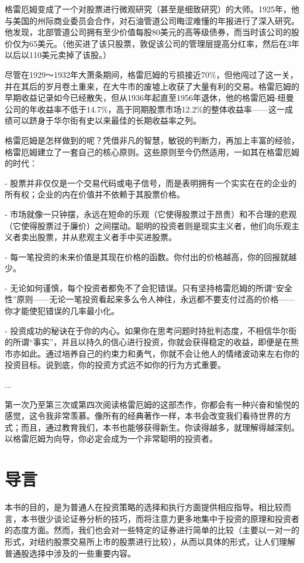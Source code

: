 \documentclass[12pt,oneside]{book}
\begin{document}
格雷厄姆变成了一个对股票进行微观研究（甚至是细致研究）的大师。1925年，他与美国的州际商业委员会合作，对石油管道公司晦涩难懂的年报进行了深入研究。他发现，北部管道公司拥有至少价值每股80美元的高等级债券，而当时该公司的股价仅为65美元。（他买进了该只股票，敦促该公司的管理层提高分红率，然后在3年以后以110美元卖掉了该股。）

尽管在1929～1932年大萧条期间，格雷厄姆的亏损接近70\%，但他闯过了这一关，并在其后的岁月卷土重来，在大牛市的废墟上收获了大量有利的交易。格雷厄姆的早期收益记录如今已经散失，但从1936年起直至1956年退休，他的格雷厄姆-纽曼公司的年收益率不低于14.7\%，高于同期股票市场12.2\%的整体收益率——这一成绩可以跻身于华尔街有史以来最佳的长期收益率之列。

格雷厄姆是怎样做到的呢？凭借非凡的智慧，敏锐的判断力，再加上丰富的经验，格雷厄姆建立了一套自己的核心原则。这些原则至今仍然适用，一如其在格雷厄姆的时代：

- 股票并非仅仅是一个交易代码或电子信号，而是表明拥有一个实实在在的企业的所有权；企业的内在价值并不依赖于其股票价格。

- 市场就像一只钟摆，永远在短命的乐观（它使得股票过于昂贵）和不合理的悲观（它使得股票过于廉价）之间摆动。聪明的投资者则是现实主义者，他们向乐观主义者卖出股票，并从悲观主义者手中买进股票。

- 每一笔投资的未来价值是其现在价格的函数。你付出的价格越高，你的回报就越少。

- 无论如何谨慎，每个投资者都免不了会犯错误。只有坚持格雷厄姆的所谓“安全性”原则——无论一笔投资看起来多么令人神往，永远都不要支付过高的价格——你才能使犯错误的几率最小化。

- 投资成功的秘诀在于你的内心。如果你在思考问题时持批判态度，不相信华尔街的所谓“事实”，并且以持久的信心进行投资，你就会获得稳定的收益，即便是在熊市亦如此。通过培养自己的约束力和勇气，你就不会让他人的情绪波动来左右你的投资目标。说到底，你的投资方式远不如你的行为方式重要。

...

第一次乃至第三次或第四次阅读格雷厄姆的这部杰作，你都会有一种兴奋和愉悦的感觉，这令我非常羡慕。像所有的经典著作一样，本书会改变我们看待世界的方式；而且，通过教育我们，本书也能够获得新生。你读得越多，就理解得越深刻。以格雷厄姆为向导，你必定会成为一个非常聪明的投资者。

\section{导言}
本书的目的，是为普通人在投资策略的选择和执行方面提供相应指导。相比较而言，本书很少谈论证券分析的技巧，而将注意力更多地集中于投资的原理和投资者的态度方面。然而，我们也会对一些特定的证券进行简单的比较（主要以一对一的形式，对纽约股票交易所上市的股票进行比较），从而以具体的形式，让人们理解普通股选择中涉及的一些重要内容。
\end{document}
